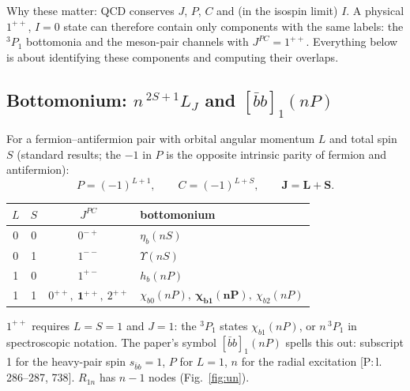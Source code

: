 \documentclass[11pt,a4paper]{article}
\newcommand{\tagP}[1]{\textcolor{blue!65!black}{\textsf{\small[P:\,#1]}}}
\newcommand{\bbnP}{[\bar bb]_1(nP)}
\begin{document}
Why these matter: QCD conserves $J$, $P$, $C$ and (in the isospin limit) $I$. A physical $1^{++}$, $I=0$ state can therefore contain only components with the same labels: the $^3P_1$ bottomonia and the meson-pair channels with $J^{PC}=1^{++}$. Everything below is about identifying these components and computing their overlaps.

\subsection{Bottomonium: $n\,^{2S+1}L_J$ and $[\bar bb]_1(nP)$}
\label{sec:qn-bb}

For a fermion--antifermion pair with orbital angular momentum $L$ and total spin $S$ (standard results; the $-1$ in $P$ is the opposite intrinsic parity of fermion and antifermion):
\begin{equation}
P=(-1)^{L+1},\qquad C=(-1)^{L+S},\qquad \bm J=\bm L+\bm S .
\end{equation}
\begin{center}
\small
\begin{tabular}{cccl}
\toprule
$L$ & $S$ & $J^{PC}$ & bottomonium\\
\midrule
0 & 0 & $0^{-+}$ & $\eta_b(nS)$\\
0 & 1 & $1^{--}$ & $\Upsilon(nS)$\\
1 & 0 & $1^{+-}$ & $h_b(nP)$\\
1 & 1 & $0^{++},\ \bm{1^{++}},\ 2^{++}$ & $\chi_{b0}(nP),\ \bm{\chi_{b1}(nP)},\ \chi_{b2}(nP)$\\
\bottomrule
\end{tabular}
\end{center}
$1^{++}$ requires $L=S=1$ and $J=1$: the $^3P_1$ states $\chi_{b1}(nP)$, or $n\,^3P_1$ in spectroscopic notation. The paper's symbol $\bbnP$ spells this out: subscript 1 for the heavy-pair spin $s_{\bar bb}=1$, $P$ for $L=1$, $n$ for the radial excitation \tagP{l.\,286--287, 738}. $R_{1n}$ has $n-1$ nodes (Fig.~\ref{fig:un}).
\end{document}
